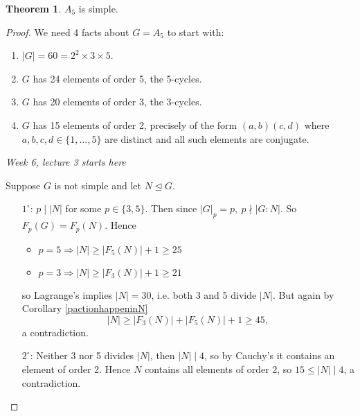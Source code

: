 \documentclass[a4paper]{article}
\theoremstyle{definition}
\newtheorem{thm}[defn]{Theorem}
\begin{document}
\begin{thm}
$A_5$ is simple.
\end{thm}
\begin{proof}
We need 4 facts about $G=A_5$ to start with:
\begin{enumerate}
\item $|G|=60=2^2\times 3\times 5$.
\item $G$ has 24 elements of order 5, the 5-cycles.
\item $G$ has 20 elements of order 3, the 3-cycles.
\item $G$ has 15 elements of order 2, precisely of the form $(a,b)(c,d)$ where $a,b,c,d \in \{1,\ldots,5\}$ are distinct and all such elements are conjugate.
\end{enumerate}

\begin{flushright}
\textit{Week 6, lecture 3 starts here}
\end{flushright}

Suppose $G$ is not simple and let $N\unlhd G$.
\begin{enumerate}
\item[$1^\circ$:] $p\mid |N|$ for some $p\in\{3,5\}$. Then since $|G|_p=p,\ p\nmid |G:N|$. So $F_p(G)=F_p(N)$. Hence
\begin{itemize}
\item $p=5\Rightarrow |N|\geq |F_5(N)|+1\geq 25$
\item $p=3\Rightarrow |N|\geq |F_3(N)|+1\geq 21$
\end{itemize}
so Lagrange's implies $|N|=30$, i.e. both 3 and 5 divide $|N|$. But again by Corollary \ref{pactionhappeninN}
\[
|N|\geq |F_3(N)|+|F_5(N)|+1\geq 45,
\]
a contradiction.
\item[$2^\circ$:] Neither 3 nor 5 divides $|N|$, then $|N|\mid 4$, so by Cauchy's it contains an element of order 2. Hence $N$ contains all elements of order 2, so $15\leq |N|\mid 4$, a contradiction.
\end{enumerate}
\end{proof}
\end{document}
